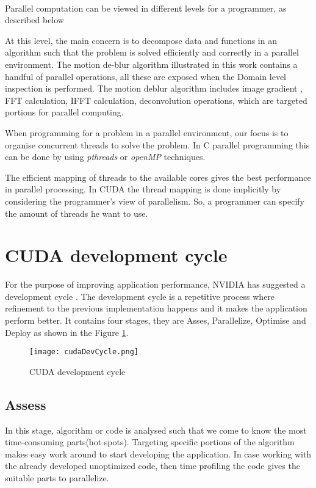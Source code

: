 \paragraph*{} Parallel computation can be viewed in different levels for a programmer, as described below
\begin{description}
\enlargethispage{-\baselineskip}
\item [Domain level] \hfill \break At this level, the main concern is to decompose data and functions in an algorithm such that the problem is solved efficiently and correctly in a parallel environment. The motion de-blur algorithm illustrated in this work contains a handful of parallel operations, all these are exposed when the Domain level inspection is performed. The motion deblur algorithm includes image gradient , FFT calculation, IFFT calculation, deconvolution operations, which are targeted portions for parallel computing.
\item [Logic level] \hfill \break When programming for a problem in a parallel environment, our focus is to organise concurrent threads to solve the problem. In C parallel programming this can be done by using \textit{pthreads} or \textit{openMP} techniques.
\item[Hardware level] \hfil \break 
The efficient mapping of threads to the available cores gives the best performance in parallel processing. In CUDA the thread mapping is done implicitly by considering the programmer's view of parallelism. So, a programmer can specify the amount of threads he want to use.
\end{description}
\section{CUDA development cycle}
 For the purpose of improving application performance, NVIDIA has suggested a development cycle \cite{apod}. The development cycle is a repetitive process where refinement to the previous implementation happens and it makes the application perform better. It contains four stages, they are Asses, Parallelize, Optimise and Deploy as shown in the Figure \ref{Figure:2.1}.
\begin{figure}[h!]
  \centering
  \texttt{[image: cudaDevCycle.png]}
  \caption{CUDA development cycle \cite{apod}}
  \label{Figure:2.1}
\end{figure}
\subsection{Assess}
In this stage, algorithm or code is analysed such that we come to know the most time-consuming parts(hot spots). Targeting specific portions of the algorithm makes easy work around to start developing the application. In case working with the already developed unoptimized code, then time profiling the code gives the suitable parts to parallelize.
